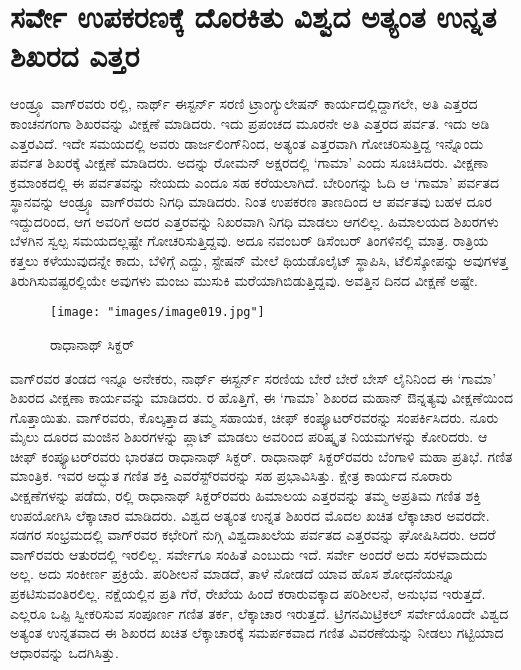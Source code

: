 
\chapter{ಸರ್ವೇ ಉಪಕರಣಕ್ಕೆ ದೊರಕಿತು ವಿಶ್ವದ ಅತ್ಯಂತ ಉನ್ನತ ಶಿಖರದ ಎತ್ತರ}

\vskip 4pt

ಆಂಡ್ರ್ಯೂ ವಾಗ್​ರವರು ರಲ್ಲಿ, ನಾರ್ಥ್ ಈಸ್ಟರ್ನ್ ಸರಣಿ ಟ್ರಾಂಗ್ಯುಲೇಷನ್​ ಕಾರ್ಯ\break ದಲ್ಲಿದ್ದಾಗಲೇ, ಅತಿ ಎತ್ತರದ ಕಾಂಚನಗಂಗಾ ಶಿಖರವನ್ನು ವೀಕ್ಷಣೆ ಮಾಡಿದರು. ಇದು ಪ್ರಪಂಚದ ಮೂರನೇ ಅತಿ ಎತ್ತರದ ಪರ್ವತ. ಇದು  ಅಡಿ ಎತ್ತರವಿದೆ. ಇದೇ ಸಮಯದಲ್ಲಿ ಅವರು ಡಾರ್ಜಲಿಂಗ್​ನಿಂದ, ಅತ್ಯಂತ ಎತ್ತರವಾಗಿ ಗೋಚರಿಸುತ್ತಿದ್ದ ಇನ್ನೊಂದು ಪರ್ವತ ಶಿಖರಕ್ಕೆ ವೀಕ್ಷಣೆ ಮಾಡಿದರು. ಅದನ್ನು ರೋಮನ್​ ಅಕ್ಷರದಲ್ಲಿ ‘ಗಾಮಾ’ ಎಂದು ಸೂಚಿಸಿದರು. ವೀಕ್ಷಣಾ ಕ್ರಮಾಂಕದಲ್ಲಿ ಈ ಪರ್ವತವನ್ನು ನೇಯದು ಎಂದೂ ಸಹ ಕರೆಯಲಾಗಿದೆ. ಬೇರಿಂಗನ್ನು ಓದಿ ಆ ‘ಗಾಮಾ’ ಪರ್ವತದ ಸ್ಥಾನವನ್ನು ಆಂಡ್ರ್ಯೂ ವಾಗ್​ರವರು ನಿಗಧಿ ಮಾಡಿದರು. ನಿಂತ ಉಪಕರಣ ತಾಣದಿಂದ ಆ ಪರ್ವತವು ಬಹಳ ದೂರ ಇದ್ದುದರಿಂದ, ಆಗ ಅವರಿಗೆ ಅದರ ಎತ್ತರವನ್ನು ನಿಖರವಾಗಿ ನಿಗಧಿ ಮಾಡಲು ಆಗಲಿಲ್ಲ. ಹಿಮಾಲಯದ ಶಿಖರಗಳು ಬೆಳಗಿನ ಸ್ವಲ್ಪ ಸಮಯದಲ್ಲಷ್ಟೇ ಗೋಚರಿಸುತ್ತಿದ್ದವು. ಅದೂ ನವಂಬರ್​ ಡಿಸೆಂಬರ್​ ತಿಂಗಳಿನಲ್ಲಿ ಮಾತ್ರ. ರಾತ್ರಿಯ ಕತ್ತಲು ಕಳೆಯುವುದನ್ನೇ ಕಾದು, ಬೆಳಿಗ್ಗೆ ಎದ್ದು, ಸ್ಟೇಷನ್​ ಮೇಲೆ ಥಿಯಡೊಲೈಟ್​ ಸ್ಥಾಪಿಸಿ, ಟೆಲಿಸ್ಕೋಪನ್ನು ಅವುಗಳತ್ತ ತಿರುಗಿಸುವಷ್ಟರಲ್ಲಿಯೇ ಅವುಗಳು ಮಂಜು ಮುಸುಕಿ ಮರೆಯಾಗಿಬಿಡುತ್ತಿದ್ದವು. ಅವತ್ತಿನ ದಿನದ ವೀಕ್ಷಣೆ ಅಷ್ಟೇ.

\begin{figure}[!hbtp]
\texttt{[image: "images/image019.jpg"]}
\caption{ರಾಧಾನಾಥ್​ ಸಿಕ್ದರ್​}\label{art15-fig1}
\end{figure}

\newpage

\vskip -5pt

ವಾಗ್​ರವರ ತಂಡದ ಇನ್ನೂ ಅನೇಕರು, ನಾರ್ಥ್ ಈಸ್ಟರ್ನ್ ಸರಣಿಯ ಬೇರೆ ಬೇರೆ ಬೇಸ್​ ಲೈನಿನಿಂದ ಈ ‘ಗಾಮಾ’ ಶಿಖರದ ವೀಕ್ಷಣಾ ಕಾರ್ಯವನ್ನು ಮಾಡಿದರು. ರ ಹೊತ್ತಿಗೆ, ಈ ‘ಗಾಮಾ’ ಶಿಖರದ ಮಹಾನ್​ ಔನ್ನತ್ಯವು ವೀಕ್ಷಣೆಯಿಂದ ಗೊತ್ತಾಯಿತು. ವಾಗ್​ರವರು, ಕೊಲ್ಕತ್ತಾದ ತಮ್ಮ ಸಹಾಯಕ, ಚೀಫ್​ ಕಂಪ್ಯೂಟರ್​ರವರನ್ನು ಸಂಪರ್ಕಿಸಿದರು. ನೂರು ಮೈಲು ದೂರದ ಮಂಜಿನ ಶಿಖರಗಳನ್ನು ಪ್ಲಾಟ್​ ಮಾಡಲು ಅವರಿಂದ ಪರಿಷ್ಕೃತ ನಿಯಮಗಳನ್ನು ಕೋರಿದರು. ಆ ಚೀಫ್​ ಕಂಪ್ಯೂಟರ್​ರವರು ಭಾರತದ ರಾಧಾನಾಥ್​ ಸಿಕ್ದರ್​. ರಾಧಾನಾಥ್​ ಸಿಕ್ದರ್​ರವರು ಬೆಂಗಾಳಿ ಮಹಾ ಪ್ರತಿಭೆ. ಗಣಿತ ಮಾಂತ್ರಿಕ. ಇವರ ಅದ್ಭುತ ಗಣಿತ ಶಕ್ತಿ ಎವರೆಸ್ಟ್​ರವರನ್ನು ಸಹ ಪ್ರಭಾವಿಸಿತ್ತು. ಕ್ಷೇತ್ರ ಕಾರ್ಯದ ನೂರಾರು ವೀಕ್ಷಣೆಗಳನ್ನು ಪಡೆದು, ರಲ್ಲಿ ರಾಧಾನಾಥ್​ ಸಿಕ್ದರ್​ರವರು ಹಿಮಾಲಯ ಎತ್ತರವನ್ನು ತಮ್ಮ ಅಪ್ರತಿಮ ಗಣಿತ ಶಕ್ತಿ ಉಪಯೋಗಿಸಿ ಲೆಕ್ಕಾಚಾರ ಮಾಡಿದರು. ವಿಶ್ವದ ಅತ್ಯಂತ ಉನ್ನತ ಶಿಖರದ ಮೊದಲ ಖಚಿತ ಲೆಕ್ಕಾಚಾರ ಅವರದೇ. ಸಡಗರ ಸಂಭ್ರಮದಲ್ಲಿ ವಾಗ್​ರವರ ಕಛೇರಿಗೆ ನುಗ್ಗಿ ವಿಶ್ವದಾಖಲೆಯ ಪರ್ವತದ ಎತ್ತರವನ್ನು ಘೋಷಿಸಿದರು. ಆದರೆ ವಾಗ್​ರವರು ಆತುರದಲ್ಲಿ ಇರಲಿಲ್ಲ. ಸರ್ವೇಗೂ ಸಂಹಿತೆ ಎಂಬುದು ಇದೆ. ಸರ್ವೇ ಅಂದರೆ ಅದು ಸರಳವಾದುದು ಅಲ್ಲ. ಅದು ಸಂಕೀರ್ಣ ಪ್ರಕ್ರಿಯೆ. ಪರಿಶೀಲನೆ ಮಾಡದೆ, ತಾಳೆ ನೋಡದೆ ಯಾವ ಹೊಸ ಶೋಧನೆಯನ್ನೂ ಪ್ರಕಟಿಸುವಂತಿರಲಿಲ್ಲ. ನಕ್ಷೆಯಲ್ಲಿನ ಪ್ರತಿ ಗೆರೆ, ರೇಖೆಯ ಹಿಂದೆ ಕರಾರುವಕ್ಕಾದ ಪರಿಶೀಲನೆ, ಅನುಭವ ಇರುತ್ತದೆ. ಎಲ್ಲರೂ ಒಪ್ಪಿ ಸ್ವೀಕರಿಸುವ ಸಂಪೂರ್ಣ ಗಣಿತ ತರ್ಕ, ಲೆಕ್ಕಾಚಾರ ಇರುತ್ತದೆ. ಟ್ರಿಗನಮಿಟ್ರಿಕಲ್​ ಸರ್ವೇಯೊಂದೇ ವಿಶ್ವದ ಅತ್ಯಂತ ಉನ್ನತವಾದ ಈ ಶಿಖರದ ಖಚಿತ ಲೆಕ್ಕಾಚಾರಕ್ಕೆ ಸಮರ್ಪಕವಾದ ಗಣಿತ ವಿವರಣೆಯನ್ನು ನೀಡಲು ಗಟ್ಟಿಯಾದ ಆಧಾರವನ್ನು ಒದಗಿಸಿತ್ತು. 

